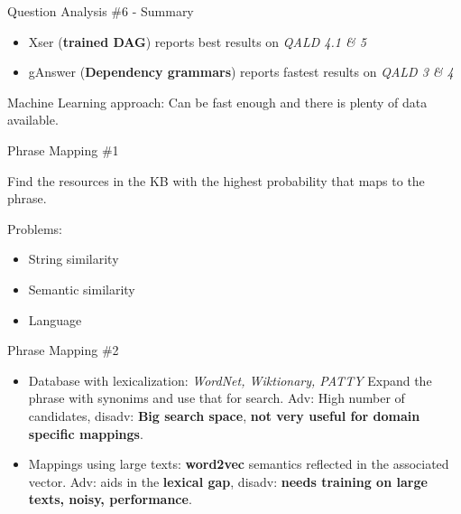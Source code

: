 \documentclass{beamer}
\begin{document}
\begin{frame}{Question Analysis \#6 - Summary}
  \begin{card}
    \begin{itemize}
      \item Xser (\textbf{trained DAG}) reports best results on \textit{QALD 4.1 \& 5}
      \item gAnswer (\textbf{Dependency grammars}) reports fastest results on \textit{QALD 3 \& 4}
    \end{itemize}

    Machine Learning approach: Can be fast enough and there is plenty of data available.
  \end{card}
\end{frame}

\begin{frame}{Phrase Mapping \#1}
  \begin{card}
    Find the resources in the KB with the highest probability that maps to the phrase.
  \end{card}
  \begin{card}
    Problems:
    \begin{itemize}
      \item String similarity
      \item Semantic similarity
      \item Language
    \end{itemize}
  \end{card}
\end{frame}


\begin{frame}{Phrase Mapping \#2}
  \begin{card}
    \begin{itemize}
      \item Database with lexicalization: \textit{WordNet, Wiktionary, PATTY} Expand the phrase with synonims and use that for search. Adv: High number of candidates, disadv: \textbf{Big search space}, \textbf{not very useful for domain specific mappings}.
      \item Mappings using large texts: \textbf{word2vec} semantics reflected in the associated vector. Adv: aids in the \textbf{lexical gap}, disadv: \textbf{needs training on large texts, noisy, performance}.
    \end{itemize}
  \end{card}
\end{frame}
\end{document}
